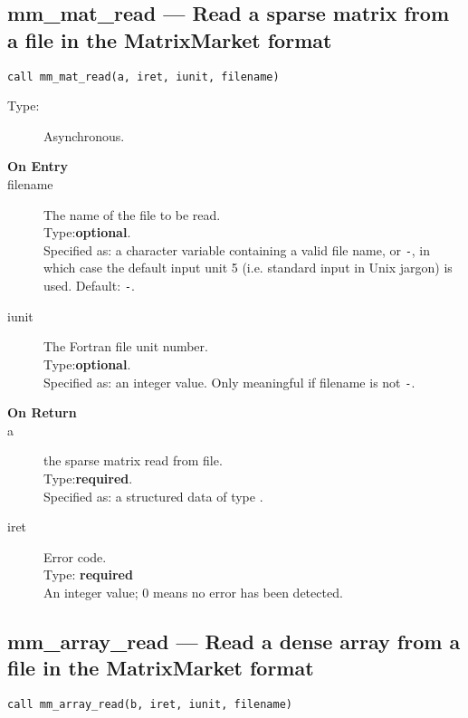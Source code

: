 \clearpage\subsection{mm\_mat\_read --- Read a sparse matrix from a
  file in the MatrixMarket format}

\begin{lstlisting}
call mm_mat_read(a, iret, iunit, filename)
\end{lstlisting}

\begin{description}
\item[Type:] Asynchronous.
\item[\bf  On Entry ]
\item[filename] The name of the file to be read.\\
Type:{\bf optional}.\\
Specified as: a character variable containing a valid file name, or
\verb|-|, in which case the default input unit  5 (i.e. standard input
in Unix jargon) is used. Default: \verb|-|. 
\item[iunit] The Fortran file unit number.\\
Type:{\bf optional}.\\
Specified as: an integer value. Only meaningful if filename is not \verb|-|.
\end{description}

\begin{description}
\item[\bf On Return]
\item[a] the sparse matrix read from file.\\
Type:{\bf required}.\\
Specified as: a structured data of type \spdata.
\item[iret] Error code.\\
Type: {\bf required} \\
An integer value; 0 means no error has been detected. 
\end{description}


\clearpage\subsection{mm\_array\_read --- Read a dense array from a
  file in the MatrixMarket format}

\begin{lstlisting}
call mm_array_read(b, iret, iunit, filename)
\end{lstlisting}

